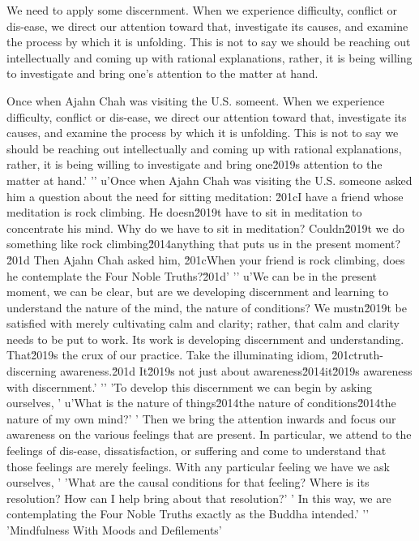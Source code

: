 We need to apply some discernment. When we experience difficulty, 
conflict or dis-ease, we direct our attention toward that, investigate 
its causes, and examine the process by which it is unfolding. This is 
not to say we should be reaching out intellectually and coming up with 
rational explanations, rather, it is being willing to investigate and 
bring one's attention to the matter at hand.

Once when Ajahn Chah was visiting the U.S. someent. When we experience difficulty, conflict or dis-ease, we direct our attention toward that, investigate its causes, and examine the process by which it is unfolding. This is not to say we should be reaching out intellectually and coming up with rational explanations, rather, it is being willing to investigate and bring one\u2019s attention to the matter at hand.'
'\n'
u'Once when Ajahn Chah was visiting the U.S. someone asked him a question about the need for sitting meditation: \u201cI have a friend whose meditation is rock climbing. He doesn\u2019t have to sit in meditation to concentrate his mind. Why do we have to sit in meditation? Couldn\u2019t we do something like rock climbing\u2014anything that puts us in the present moment?\u201d Then Ajahn Chah asked him, \u201cWhen your friend is rock climbing, does he contemplate the Four Noble Truths?\u201d'
'\n'
u'We can be in the present moment, we can be clear, but are we developing discernment and learning to understand the nature of the mind, the nature of conditions? We mustn\u2019t be satisfied with merely cultivating calm and clarity; rather, that calm and clarity needs to be put to work. Its work is developing discernment and understanding. That\u2019s the crux of our practice. Take the illuminating idiom, \u201ctruth-discerning awareness.\u201d It\u2019s not just about awareness\u2014it\u2019s awareness with discernment.'
'\n'
'To develop this discernment we can begin by asking ourselves, '
u'What is the nature of things\u2014the nature of conditions\u2014the nature of my own mind?'
' Then we bring the attention inwards and focus our awareness on the various feelings that are present. In particular, we attend to the feelings of dis-ease, dissatisfaction, or suffering and come to understand that those feelings are merely feelings. With any particular feeling we have we ask ourselves, '
'What are the causal conditions for that feeling? Where is its resolution? How can I help bring about that resolution?'
' In this way, we are contemplating the Four Noble Truths exactly as the Buddha intended.'
'\n'
'Mindfulness With Moods and Defilements'
